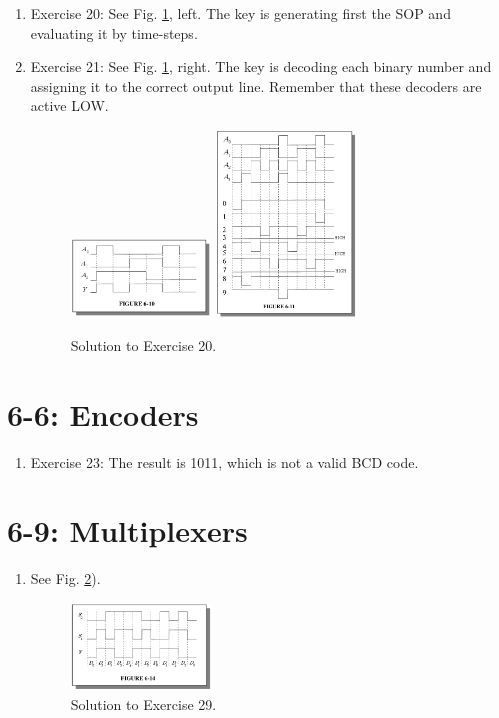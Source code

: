\documentclass[10pt]{article}
\begin{document}
\begin{enumerate}
\item Exercise 20: See Fig. \ref{fig:exer20}, left.  The key is generating first the SOP and evaluating it by time-steps.
\item Exercise 21: See Fig. \ref{fig:exer20}, right.  The key is decoding each binary number and assigning it to the correct output line.  Remember that these decoders are active LOW.
\begin{figure}[hb]
\centering
\includegraphics[width=0.35\textwidth]{exercise20.png}
\includegraphics[width=0.35\textwidth]{exercise21.png}
\caption{\label{fig:exer20} Solution to Exercise 20.}
\end{figure}
\end{enumerate}

\section{6-6: Encoders}

\begin{enumerate}
\item Exercise 23: The result is 1011, which is not a valid BCD code.
\end{enumerate}

\section{6-9: Multiplexers}

\begin{enumerate}
\item See Fig. \ref{fig:exer29}).
\begin{figure}[hb]
\centering
\includegraphics[width=0.35\textwidth]{exercise29.png}
\caption{\label{fig:exer29} Solution to Exercise 29.}
\end{figure}
\end{enumerate}
\end{document}
